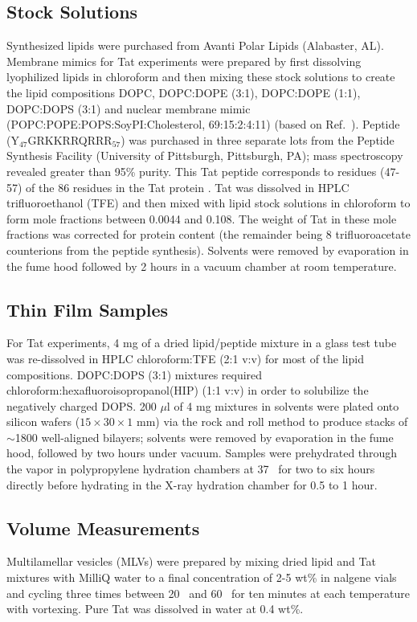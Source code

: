 \subsection{Stock Solutions}
Synthesized lipids were purchased from Avanti Polar Lipids (Alabaster, AL). 
Membrane mimics for Tat experiments were prepared by first 
dissolving lyophilized lipids in chloroform and then mixing these stock 
solutions to create the lipid compositions
DOPC, DOPC:DOPE (3:1), DOPC:DOPE (1:1), DOPC:DOPS (3:1) and nuclear membrane
mimic (POPC:POPE:POPS:SoyPI:Cholesterol, 69:15:2:4:11) (based on Ref.~\cite{Jarasch73}). 
Peptide (Y$_{47}$GRKKRRQRRR$_{57}$) was purchased in three separate lots from the 
Peptide Synthesis Facility (University of Pittsburgh, Pittsburgh, PA); 
mass spectroscopy revealed greater than 95\% purity. 
This Tat peptide corresponds to residues (47-57) of the 86 residues in the Tat 
protein \cite{Vives97}. 
Tat was dissolved in HPLC trifluoroethanol (TFE) and then mixed with lipid 
stock solutions in chloroform to form mole fractions between 0.0044 and 0.108. 
The weight of Tat in these mole fractions was corrected for protein content 
(the remainder being 8 trifluoroacetate counterions from the peptide synthesis). 
Solvents were removed by evaporation in the fume hood followed
by 2 hours in a vacuum chamber at room temperature.

\subsection{Thin Film Samples}
For Tat experiments, 4 mg of a dried lipid/peptide mixture 
in a glass test tube was re-dissolved 
in HPLC chloroform:TFE (2:1 v:v) for most of the lipid compositions. 
DOPC:DOPS (3:1) mixtures required chloroform:hexafluoroisopropanol(HIP) (1:1 v:v) in order to 
solubilize the negatively charged DOPS. 200 $\mu$l of 4 mg mixtures in 
solvents were plated onto silicon wafers ($15\times 30\times 1$ mm) via 
the rock and roll method \cite{Tristram-Nagle07_MMB} 
to produce stacks of $\sim$1800 well-aligned 
bilayers; solvents were removed by evaporation in the fume hood, followed by 
two hours under vacuum. Samples were prehydrated through the
vapor in polypropylene hydration chambers at 37 \textcelsius\ for two to six 
hours directly before hydrating in the X-ray hydration chamber 
\cite{Kucerka05_BPJ} for 0.5 to 1 hour. 

\subsection{Volume Measurements}\label{sec:volume_method}
Multilamellar vesicles (MLVs) were prepared by mixing dried lipid and Tat mixtures with 
MilliQ water to a final concentration of 2-5 wt\% in nalgene vials and cycling 
three times between 20 \textcelsius\ and 60 \textcelsius\ for ten minutes at 
each temperature with vortexing. Pure Tat was dissolved in water at 0.4 wt\%.


